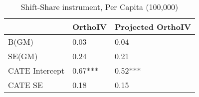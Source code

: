 \begin{table}\centering\caption{Shift-Share instrument, Per Capita (100,000)}\begin{tabular}{lll}
\toprule
                & OrthoIV   & Projected OrthoIV   \\
\midrule
 B(GM)          & 0.03      & 0.04                \\
 SE(GM)         & 0.24      & 0.21                \\
 CATE Intercept & 0.67***   & 0.52***             \\
 CATE SE        & 0.18      & 0.15                \\
\bottomrule
\end{tabular}\end{table}